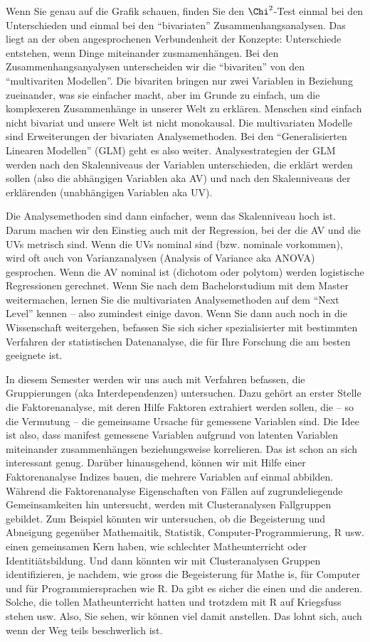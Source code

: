 \documentclass[
  10pt,
  letterpaper,
  a4paper, twoside]{scrreprt}
\begin{document}
Wenn Sie genau auf die Grafik schauen, finden Sie den \(\Chi^2\)-Test
einmal bei den Unterschieden und einmal bei den \enquote{bivariaten}
Zusammenhangsanalysen. Das liegt an der oben angesprochenen
Verbundenheit der Konzepte: Unterschiede entstehen, wenn Dinge
miteinander zusmamenhängen. Bei den Zusammenhangsanyalysen unterscheiden
wir die \enquote{bivariten} von den \enquote{multivariten Modellen}. Die
bivariten bringen nur zwei Variablen in Beziehung zueinander, was sie
einfacher macht, aber im Grunde zu einfach, um die komplexeren
Zusammenhänge in unserer Welt zu erklären. Menschen sind einfach nicht
bivariat und unsere Welt ist nicht monokausal. Die multivariaten Modelle
sind Erweiterungen der bivariaten Analysemethoden. Bei den
\enquote{Generalisierten Linearen Modellen} (GLM) geht es also weiter.
Analysestrategien der GLM werden nach den Skalenniveaus der Variablen
unterschieden, die erklärt werden sollen (also die abhängigen Variablen
aka AV) und nach den Skalenniveaus der erklärenden (unabhängigen
Variablen aka UV).

Die Analysemethoden sind dann einfacher, wenn das Skalenniveau hoch ist.
Darum machen wir den Einstieg auch mit der Regression, bei der die AV
und die UVs metrisch sind. Wenn die UVs nominal sind (bzw. nominale
vorkommen), wird oft auch von Varianzanalysen (Analysis of Variance aka
ANOVA) gesprochen. Wenn die AV nominal ist (dichotom oder polytom)
werden logistische Regressionen gerechnet. Wenn Sie nach dem
Bachelorstudium mit dem Master weitermachen, lernen Sie die
multivariaten Analysemethoden auf dem \enquote{Next Level} kennen --
also zumindest einige davon. Wenn Sie dann auch noch in die Wissenschaft
weitergehen, befassen Sie sich sicher spezialisierter mit bestimmten
Verfahren der statistischen Datenanalyse, die für Ihre Forschung die am
besten geeignete ist.

In diesem Semester werden wir uns auch mit Verfahren befassen, die
Gruppierungen (aka Interdependenzen) untersuchen. Dazu gehört an erster
Stelle die Faktorenanalyse, mit deren Hilfe Faktoren extrahiert werden
sollen, die -- so die Vermutung -- die gemeinsame Ursache für gemessene
Variablen sind. Die Idee ist also, dass manifest gemessene Variablen
aufgrund von latenten Variablen miteinander zusammenhängen
beziehungsweise korrelieren. Das ist schon an sich interessant genug.
Darüber hinausgehend, können wir mit Hilfe einer Faktorenanalyse Indizes
bauen, die mehrere Variablen auf einmal abbilden. Während die
Faktorenanalyse Eigenschaften von Fällen auf zugrundeliegende
Gemeinsamkeiten hin untersucht, werden mit Clusteranalysen Fallgruppen
gebildet. Zum Beispiel könnten wir untersuchen, ob die Begeisterung und
Abneigung gegenüber Mathemaitik, Statistik, Computer-Programmierung, R
usw. einen gemeinsamen Kern haben, wie schlechter Matheunterricht oder
Identitiätsbildung. Und dann könnten wir mit Clusteranalysen Gruppen
identifizieren, je nachdem, wie gross die Begeisterung für Mathe is, für
Computer und für Programmiersprachen wie R. Da gibt es sicher die einen
und die anderen. Solche, die tollen Matheunterricht hatten und trotzdem
mit R auf Kriegsfuss stehen usw. Also, Sie sehen, wir können viel damit
anstellen. Das lohnt sich, auch wenn der Weg teils beschwerlich ist.
\end{document}
